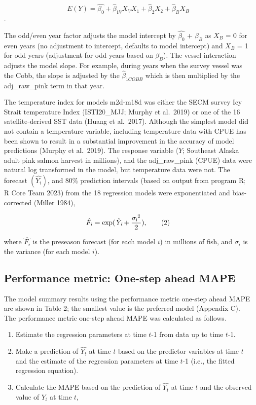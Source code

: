 \documentclass[
  letterpaper,
  DIV=11,
  numbers=noendperiod]{scrartcl}
\begin{document}
\[E(Y) = \hat{\beta_0} + \hat {\beta}_{1V}{X_V}{X_1} +\hat {\beta}_{2}{X_2}+\hat {\beta}_{B}{X_B}\].

The odd/even year factor adjusts the model intercept by
\(\hat{\beta_0}\) + \({\beta}_{B}\) as \({X_B}\) = 0 for even years (no
adjustment to intercept, defaults to model intercept) and \({X_B}\) = 1
for odd years (adjustment for odd years based on \({\beta}_{B}\)). The
vessel interaction adjusts the model slope. For example, during years
when the survey vessel was the Cobb, the slope is adjusted by the
\(\hat {\beta}_{1COBB}\) which is then multiplied by the adj\_raw\_pink
term in that year.

The temperature index for models m2d-m18d was either the SECM survey Icy
Strait temperature Index (ISTI20\_MJJ; Murphy et al.~2019) or one of the
16 satellite-derived SST data (Huang et al.~2017). Although the simplest
model did not contain a temperature variable, including temperature data
with CPUE has been shown to result in a substantial improvement in the
accuracy of model predictions (Murphy et al.~2019). The response
variable (\(Y\); Southeast Alaska adult pink salmon harvest in
millions), and the adj\_raw\_pink (CPUE) data were natural log
transformed in the model, but temperature data were not. The forecast
\((\hat{\textit {Y}_{i}})\), and 80\% prediction intervals (based on
output from program R; R Core Team 2023) from the 18 regression models
were exponentiated and bias-corrected (Miller 1984),

\[\hat{F_i} = \rm exp (\hat{\textit {Y}_{\textit i}} + \frac{{\sigma_i}^2}{2}),\tag{2}\]

where \({\hat {F_i}}\) is the preseason forecast (for each model \(i\))
in millions of fish, and \(\sigma_i\) is the variance (for each model
\(i\)).

\subsection{Performance metric: One-step ahead
MAPE}\label{performance-metric-one-step-ahead-mape}

The model summary results using the performance metric one-step ahead
MAPE are shown in Table 2; the smallest value is the preferred model
(Appendix C). The performance metric one-step ahead MAPE was calculated
as follows.

\begin{enumerate}
\def\labelenumi{\arabic{enumi}.}
\item
  Estimate the regression parameters at time \(t\)-1 from data up to
  time \(t\)-1.
\item
  Make a prediction of \({\hat{Y_t}}\) at time \(t\) based on the
  predictor variables at time \(t\) and the estimate of the regression
  parameters at time \(t\)-1 (i.e., the fitted regression equation).
\item
  Calculate the MAPE based on the prediction of \({\hat{Y_t}}\) at time
  \(t\) and the observed value of \({Y_t}\) at time \(t\),
\end{enumerate}
\end{document}
